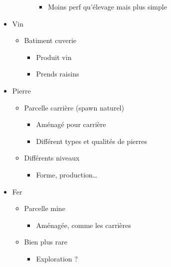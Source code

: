\documentclass[
]{article}
\providecommand{\tightlist}{%
  \setlength{\itemsep}{0pt}\setlength{\parskip}{0pt}}
\begin{document}
\begin{itemize}
\begin{itemize}
\begin{itemize}
      \begin{itemize}
      \tightlist
      \item
        Moins perf qu'élevage mais plus simple
      \end{itemize}
    \end{itemize}
  \end{itemize}
\item
  Vin

  \begin{itemize}
  \tightlist
  \item
    Batiment cuverie

    \begin{itemize}
    \tightlist
    \item
      Produit vin
    \item
      Prends raisins
    \end{itemize}
  \end{itemize}
\item
  Pierre

  \begin{itemize}
  \tightlist
  \item
    Parcelle carrière (spawn naturel)

    \begin{itemize}
    \tightlist
    \item
      Aménagé pour carrière
    \item
      Différent types et qualités de pierres
    \end{itemize}
  \item
    Différents niveaux

    \begin{itemize}
    \tightlist
    \item
      Forme, production\ldots{}
    \end{itemize}
  \end{itemize}
\item
  Fer

  \begin{itemize}
  \tightlist
  \item
    Parcelle mine

    \begin{itemize}
    \tightlist
    \item
      Aménagée, comme les carrières
    \end{itemize}
  \item
    Bien plus rare

    \begin{itemize}
    \tightlist
    \item
      Exploration ?
    \end{itemize}
  \end{itemize}
\end{itemize}
\end{document}
